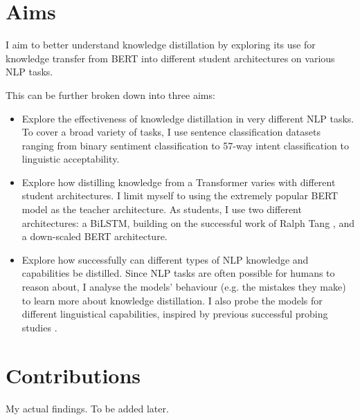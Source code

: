 \documentclass[bsc,frontabs,twoside,singlespacing,parskip,deptreport]{infthesis}
\begin{document}
{{  %
  }
  
  \section{Aims}{
    I aim to better understand knowledge distillation by exploring its use for knowledge transfer from BERT into different student architectures on various NLP tasks.

    This can be further broken down into three aims:
    \begin{itemize}
      \item Explore the effectiveness of knowledge distillation in very different NLP tasks. To cover a broad variety of tasks, I use sentence classification datasets ranging from binary sentiment classification to 57-way intent classification to linguistic acceptability.
      \item Explore how distilling knowledge from a Transformer varies with different student architectures. I limit myself to using the extremely popular BERT model \citep{Devlin_2018} as the teacher architecture. As students, I use two different architectures: a BiLSTM, building on the successful work of Ralph Tang \citep{Tang_2019a,Tang_2019b}, and a down-scaled BERT architecture.
      \item Explore how successfully can different types of NLP knowledge and capabilities be distilled. Since NLP tasks are often possible for humans to reason about, I analyse the models' behaviour (e.g. the mistakes they make) to learn more about knowledge distillation. I also probe the models for different linguistical capabilities, inspired by previous successful probing studies \citep{Conneau_2018,Tenney_2019b}.
    \end{itemize}
  }
  
  \section{Contributions}{
    My actual findings. To be added later.
  }
}
\end{document}

